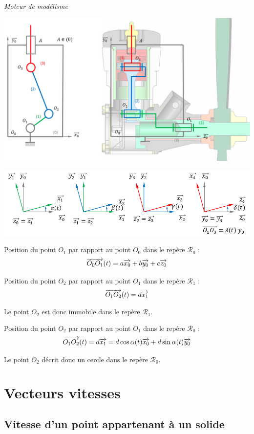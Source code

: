 \documentclass[11pt,oneside]{article}
\begin{document}
\begin{exemple}
\textit{Moteur de modélisme}

\begin{center}
\includegraphics[width=.75\textwidth]{png/moteur_2d_sch}
\end{center}
\begin{center}
\includegraphics[width=.85\textwidth]{png/param}
\end{center}

Position du point $O_1$ par rapport au point $O_0$ dans le repère $\mathcal{R}_0$ : 
$$
\overrightarrow{O_0 O_1}(t)= a\overrightarrow{x_0}+b\overrightarrow{y_0}+c\overrightarrow{z_0}
$$

Position du point $O_2$ par rapport au point $O_1$ dans le repère $\mathcal{R}_1$ : 
$$
\overrightarrow{O_1 O_2}(t)= d\overrightarrow{x_1}
$$

Le point $O_2$ est donc immobile dans le repère $\mathcal{R}_1$.

Position du point $O_2$ par rapport au point $O_1$ dans le repère $\mathcal{R}_0$ : 
$$
\overrightarrow{O_1 O_2}(t)= d\overrightarrow{x_1}=d\cos\alpha(t)\overrightarrow{x_0}+d\sin\alpha(t)\overrightarrow{y_0}
$$

Le point $O_2$ décrit donc un cercle dans le repère $\mathcal{R}_0$.

\end{exemple}



\section{Vecteurs vitesses}
\subsection{Vitesse d'un point appartenant à un solide}
\end{document}
